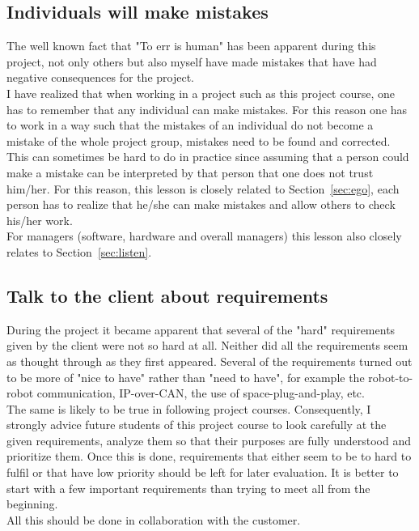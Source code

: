 \subsection{Individuals will make mistakes}
The well known fact that "To err is human" has been apparent during this project, not only others but also myself have made mistakes that have had negative consequences for the project. \\ 
I have realized that when working in a project such as this project course, one has to remember that any individual can make mistakes. For this reason one has to work in a way such that the mistakes of an individual do not become a mistake of the whole project group, mistakes need to be found and corrected. This can sometimes be hard to do in practice since assuming that a person could make a mistake can be interpreted by that person that one does not trust him/her. For this reason, this lesson is closely related to Section~\ref{sec:ego}, each person has to realize that he/she can make mistakes and allow others to check his/her work. \\
For managers (software, hardware and overall managers) this lesson also closely relates to Section~\ref{sec:listen}.


\subsection{Talk to the client about requirements}\label{sec:client}
During the project it became apparent that several of the "hard" requirements given by the client were not so hard at all. Neither did all the requirements seem as thought through as they first appeared. Several of the requirements turned out to be more of "nice to have" rather than "need to have", for example the robot-to-robot communication, IP-over-CAN, the use of space-plug-and-play, etc. \\

The same is likely to be true in following project courses. Consequently, I strongly advice future students of this project course to look carefully at the given requirements, analyze them so that their purposes are fully understood and prioritize them. Once this is done, requirements that either seem to be to hard to fulfil or that have low priority should be left for later evaluation. It is better to start with a few important requirements than trying to meet all from the beginning. \\
All this should be done in collaboration with the customer.

